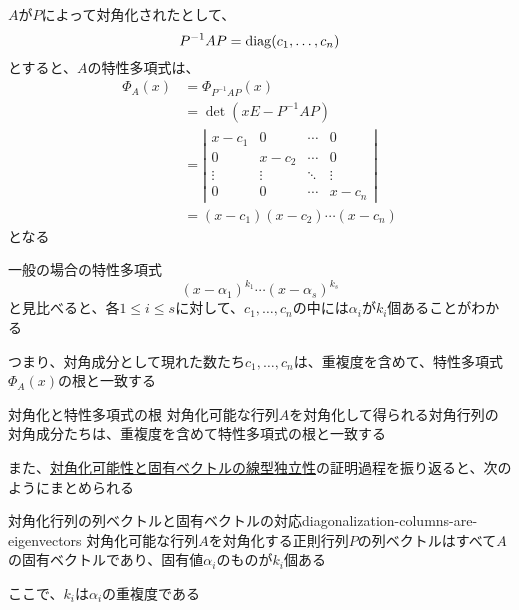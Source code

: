 \documentclass[../../../topic_linear-algebra]{subfiles}
\begin{document}
$A$が$P$によって対角化されたとして、
\begin{equation*}
  P^{-1}AP= \operatorname{diag}(c_1,\ldots, c_n)
\end{equation*}
とすると、$A$の特性多項式は、
\begin{align*}
  \Phi_A(x) & = \Phi_{P^{-1}AP}(x)                          \\
            & = \det(xE - P^{-1}AP)                         \\
            & = \left| \begin{matrix}
                         x - c_1 & 0       & \cdots & 0       \\
                         0       & x - c_2 & \cdots & 0       \\
                         \vdots  & \vdots  & \ddots & \vdots  \\
                         0       & 0       & \cdots & x - c_n
                       \end{matrix} \right| \\
            & = (x - c_1)(x - c_2) \cdots (x - c_n)
\end{align*}
となる

一般の場合の特性多項式
\begin{equation*}
  (x- \alpha_1)^{k_1}\cdots (x - \alpha_s)^{k_s}
\end{equation*}
と見比べると、各$1 \leq i \leq s$に対して、$c_1,\ldots,c_n$の中には$\alpha_i$が$k_i$個あることがわかる

\br

つまり、対角成分として現れた数たち$c_1,\ldots,c_n$は、重複度を含めて、特性多項式$\Phi_A(x)$の根と一致する

\begin{theorem*}{対角化と特性多項式の根}
  対角化可能な行列$A$を対角化して得られる対角行列の対角成分たちは、重複度を含めて特性多項式の根と一致する
\end{theorem*}

また、\hyperref[thm:diagonalizable-iff-n-indep-eigenvectors]{対角化可能性と固有ベクトルの線型独立性}の証明過程を振り返ると、次のようにまとめられる

\begin{theorem}{対角化行列の列ベクトルと固有ベクトルの対応}{diagonalization-columns-are-eigenvectors}
  対角化可能な行列$A$を対角化する正則行列$P$の列ベクトルはすべて$A$の固有ベクトルであり、固有値$\alpha_i$のものが$k_i$個ある

  ここで、$k_i$は$\alpha_i$の重複度である
\end{theorem}
\end{document}
